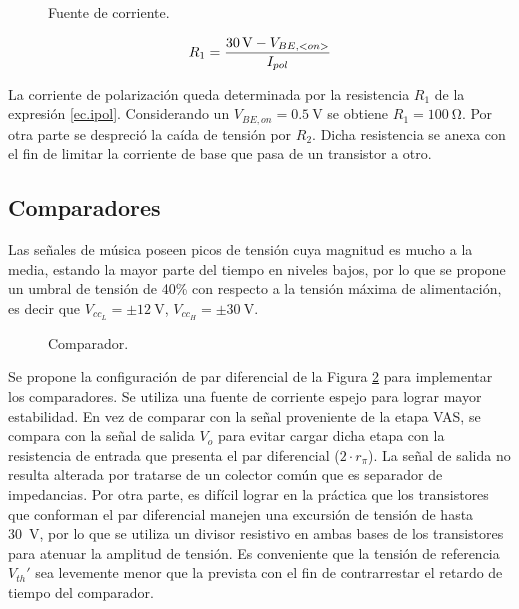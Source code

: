	\begin{figure}[H]
		\centering
		\scalebox{0.5}{}
		\caption{Fuente de corriente.}
		\label{fig.fte}
	\end{figure}

\begin{equation}
	\centering
	R_1 = \frac{\SI{30}{\volt} - V_{BE, <on>} }{ I_{pol} }
	\label{ec.ipol}
\end{equation}

La corriente de polarización queda determinada por la resistencia $R_1$ de la expresión \ref{ec.ipol}. Considerando un $V_{BE,on} = \SI{0.5}{\volt}$ se obtiene $R_1 = \SI{100}{\ohm}$. Por otra parte se despreció la caída de tensión por $R_2$. Dicha resistencia se anexa con el fin de limitar la corriente de base que pasa de un transistor a otro.


\subsection{Comparadores}

	Las señales de música poseen picos de tensión cuya magnitud es mucho a la media, estando la mayor parte del tiempo en niveles bajos, por lo que se propone un umbral de tensión de 40\% con respecto a la tensión máxima de alimentación, es decir que $V_{cc_L} = \pm \SI{12}{\volt}$, $V_{cc_H} = \pm \SI{30}{\volt}$. 

	\begin{figure}[H]
		\centering
		\scalebox{0.5}{}
		\caption{Comparador.}
		\label{fig.comparador}
	\end{figure}

	Se propone la configuración de par diferencial de la Figura \ref{fig.comparador} para implementar los comparadores. Se utiliza una fuente de corriente espejo para lograr mayor estabilidad. En vez de comparar con la señal proveniente de la etapa VAS, se compara con la señal de salida $V_{o}$ para evitar cargar dicha etapa con la resistencia de entrada que presenta el par diferencial ($2\cdot r_\pi$). La señal de salida no resulta alterada por tratarse de un colector común que es separador de impedancias.
	Por otra parte, es difícil lograr en la práctica que los transistores que conforman el par diferencial manejen una excursión de tensión de hasta \SI{30}{\volt}, por lo que se utiliza un divisor resistivo en ambas bases de los transistores para atenuar la amplitud de tensión. Es conveniente que la tensión de referencia $V_{th}'$ sea levemente menor que la prevista con el fin de contrarrestar el retardo de tiempo del comparador.

